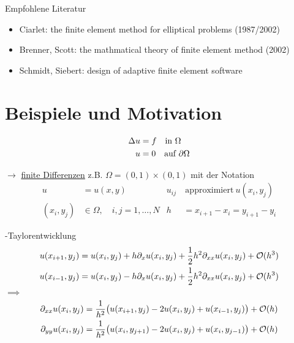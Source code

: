 
Empfohlene Literatur
\begin{itemize}
	\item Ciarlet: the finite element method for elliptical problems (1987/2002)
	\item Brenner, Scott: the mathmatical theory of finite element method (2002)
	\item Schmidt, Siebert: design of adaptive finite element software
\end{itemize}

\section{Beispiele und Motivation}

\begin{align*}
	\Delta u &= f \quad  \text{in }  \Omega\\
		  	 u &= 0 \quad \text{auf } \partial\Omega
\end{align*}

$\rightarrow$ \underline{finite Differenzen}\nl
z.B. $\Omega = (0,1) \times (0,1)$ mit der Notation
\begin{align*}
	 u&= u(x,y)				 &   u_{ij}&\ \text{approximiert}\ u(x_i,y_j)\\
	(x_i, y_j) &\in \Omega, \quad i,j = 1,\dots,N&  h&= x_{i+1} - x_i = y_{i+1}-y_i
\end{align*}

-Taylorentwicklung
\begin{align*}
	u(x_{i+1},y_j) &= 	u(x_{i},y_j) + 	h\partial_x u(x_{i},y_j) + \frac{1}{2}h^2 \partial_{xx}	u(x_i,y_j) + \mathcal{O}(h^3)\\
	u(x_{i-1},y_j) &= 	u(x_{i},y_j) - 	h\partial_x u(x_{i},y_j) + \frac{1}{2}h^2 \partial_{xx}	u(x_i,y_j) + \mathcal{O}(h^3)\\
\end{align*}
$\implies$
\begin{align*}
	\partial_{xx} u(x_i,y_j) &= \frac{1}{h^2}\big(	u(x_{i+1},y_j) - 2u(x_i,y_j) + 	u(x_{i-1},y_j) \big) + \mathcal{O}(h)\\
	\partial_{yy} u(x_i,y_j) &= \frac{1}{h^2}\big(	u(x_i,y_{j+1}) - 2u(x_i,y_j) + 	u(x_i,y_{j-1}) \big) + \mathcal{O}(h)
\end{align*}


